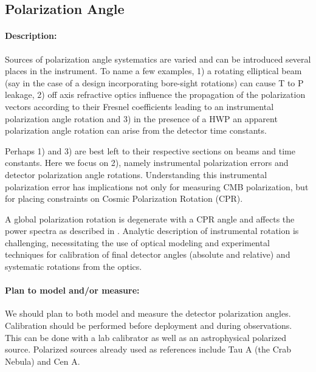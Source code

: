 \subsection{Polarization Angle}

\paragraph{Description:}

Sources of polarization angle systematics are varied and can be introduced
several places in the instrument. To name a few examples, 1) a rotating elliptical beam (say
in the case of a design incorporating bore-sight rotations) can cause T to P
leakage, 2) off axis refractive optics influence the propagation of the
polarization vectors according to their Fresnel coefficients leading to an
instrumental polarization angle rotation and 3) in the presence of a HWP an
apparent polarization angle rotation can arise from the detector time
constants. 

Perhaps 1) and 3) are best left to their respective sections on beams and time
constants. Here we focus on 2), namely instrumental polarization errors and
detector polarization angle rotations. Understanding this instrumental
polarization error has implications not only for measuring CMB polarization,
but for placing constraints on Cosmic Polarization Rotation (CPR).

A global polarization rotation is degenerate with a CPR angle and affects the
power spectra as described in \cite{2013ApJ...762L..23K}. Analytic description
of instrumental rotation is challenging, necessitating the use of optical
modeling and experimental techniques for calibration of final detector angles
(absolute and relative) and systematic rotations from the optics.

\paragraph{Plan to model and/or measure:}
We should plan to both model and measure the detector polarization angles.
Calibration should be performed before deployment and during observations. This
can be done with a lab calibrator as well as an astrophysical polarized
source. Polarized sources already used as references include Tau A (the Crab
Nebula) and Cen A.

